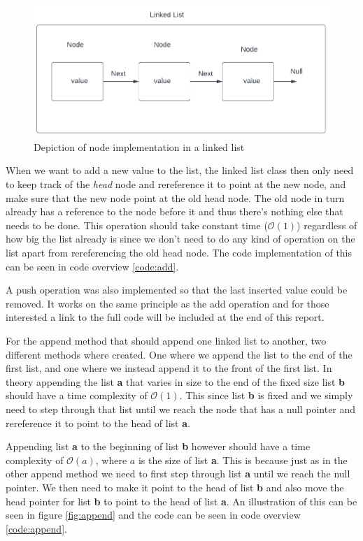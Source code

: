 \documentclass[a4paper,11pt]{article}
\begin{document}
\begin{figure}[h]
    \centering
    \includegraphics[width=.8\textwidth]{linkedListDiagram.pdf}
    \caption{Depiction of node implementation in a linked list}
    \label{fig:linkedListDiagram}
\end{figure}
When we want to add a new value to the list, the linked list class then only need to keep track of the \textit{head} 
node and rereference it to point at the new node, and make sure that the new node point at the old head node. 
The old node in turn already has a reference to the node before it and thus there's nothing else that needs 
to be done. This operation should take constant time ($\mathcal{O}(1)$) regardless of how big the list already is since we don't 
need to do any kind of operation on the list apart from rereferencing the old head node. The code implementation of this can be seen
in code overview \ref{code:add}.

A push operation was also implemented so that the last inserted value could be removed. It works on the same principle as
the add operation and for those interested a link to the full code will be included at the end of this report.

For the append method that should append one linked list to another, two different methods where created. One where we append
the list to the end of the first list, and one where we instead append it to the front of the first list. In theory appending 
the list \textbf{a} that varies in size to the end of the fixed size list \textbf{b} should have a time complexity of 
$\mathcal{O}(1)$. This since list \textbf{b} is fixed and we simply need to step through that list until we reach the node 
that has a null pointer and rereference it to point to the head of list \textbf{a}.

Appending list \textbf{a} to the beginning of list \textbf{b} however should have a time complexity of $\mathcal{O}(a)$, where $a$ 
is the size of list \textbf{a}. This is because just as in the other append method we need to first step through list \textbf{a}
until we reach the null pointer. We then need to make it point to the head of list \textbf{b} and also move the head pointer for list
\textbf{b} to point to the head of list \textbf{a}. An illustration of this can be seen in figure \ref{fig:append} and the code 
can be seen in code overview \ref{code:append}.
\end{document}
